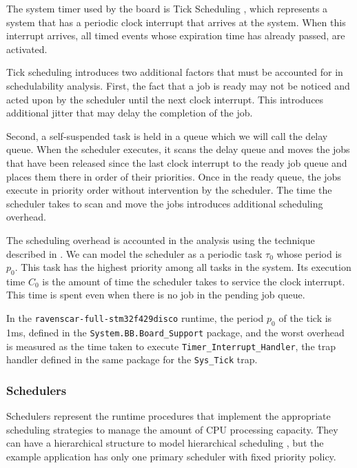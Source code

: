 \documentclass{article}
\begin{document}
The system timer used by the board is Tick Scheduling \cite{tick-scheduling}, which represents a system that has a periodic clock interrupt that arrives at the system. When this interrupt arrives, all timed events whose expiration time has already passed, are activated.

Tick scheduling introduces two additional factors that must be accounted for in schedulability analysis. First, the fact that a job is ready may not be noticed and acted upon by the scheduler until the next clock interrupt. This introduces additional jitter that may delay the completion of the job.

Second, a self-suspended task is held in a queue which we will call the delay queue. When the scheduler executes, it scans the delay queue and moves the jobs that have been released since the last clock interrupt to the ready job queue and places them there in order of their priorities. Once in the ready queue, the jobs execute in priority order without intervention by the scheduler. The time the scheduler takes to scan and move the jobs introduces additional scheduling overhead.

The scheduling overhead is accounted in the analysis using the technique described in \cite{effects-runtime}. We can model the scheduler as a periodic task $\tau_0$ whose period is $p_0$. This task has the highest priority among all tasks in the system. Its execution time $C_0$ is the amount of time the scheduler takes to service the clock interrupt. This time is spent even when there is no job in the pending job queue.

In the \texttt{ravenscar-full-stm32f429disco} runtime, the period $p_0$ of the tick is 1ms, defined in the \texttt{System.BB.Board\_Support} package, and the worst overhead is measured as the time taken to execute \texttt{Timer\_Interrupt\_Handler}, the trap handler defined in the same package for the \texttt{Sys\_Tick} trap.

\subsubsection{Schedulers}

Schedulers represent the runtime procedures that implement the appropriate scheduling strategies to manage the amount of CPU processing capacity. They can have a hierarchical structure to model hierarchical scheduling \cite{hierarchical-scheduling}, but the example application has only one primary scheduler with fixed priority policy.
\end{document}
